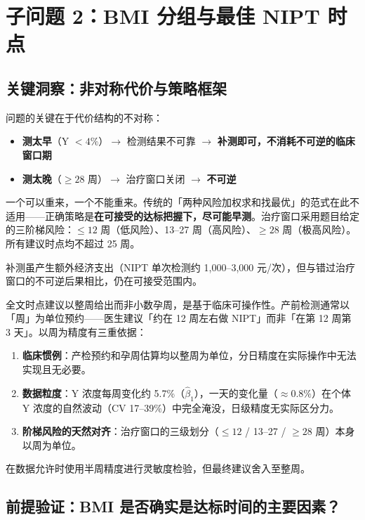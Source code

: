 \documentclass{mcm-paper}
\begin{document}
\newpage

\section{子问题 2：BMI 分组与最佳 NIPT 时点}
\label{sec:sub2}

\subsection{关键洞察：非对称代价与策略框架}

问题的关键在于代价结构的不对称：
\begin{itemize}
    \item \textbf{测太早}（Y $<4\%$）$\to$ 检测结果不可靠 $\to$ \textbf{补测即可，不消耗不可逆的临床窗口期}
    \item \textbf{测太晚}（$\geq 28$ 周）$\to$ 治疗窗口关闭 $\to$ \textbf{不可逆}
\end{itemize}

一个可以重来，一个不能重来。传统的「两种风险加权求和找最优」的范式在此不适用——正确策略是\textbf{在可接受的达标把握下，尽可能早测}。治疗窗口采用题目给定的三阶梯风险：$\leq 12$ 周（低风险）、13--27 周（高风险）、$\geq 28$ 周（极高风险）。所有建议时点均不超过 25 周。

补测虽产生额外经济支出（NIPT 单次检测约 1,000--3,000 元/次），但与错过治疗窗口的不可逆后果相比，仍在可接受范围内。

全文时点建议以整周给出而非小数孕周，是基于临床可操作性。产前检测通常以「周」为单位预约——医生建议「约在 12 周左右做 NIPT」而非「在第 12 周第 3 天」。以周为精度有三重依据：
\begin{enumerate}
    \item \textbf{临床惯例}：产检预约和孕周估算均以整周为单位，分日精度在实际操作中无法实现且无必要。
    \item \textbf{数据粒度}：Y 浓度每周变化约 5.7\%（$\hat{\beta}_1$），一天的变化量（$\approx 0.8\%$）在个体 Y 浓度的自然波动（CV 17--39\%）中完全淹没，日级精度无实际区分力。
    \item \textbf{阶梯风险的天然对齐}：治疗窗口的三级划分（$\leq 12$ / 13--27 / $\geq 28$ 周）本身以周为单位。
\end{enumerate}

在数据允许时使用半周精度进行灵敏度检验，但最终建议舍入至整周。

\subsection{前提验证：BMI 是否确实是达标时间的主要因素？}
\end{document}
